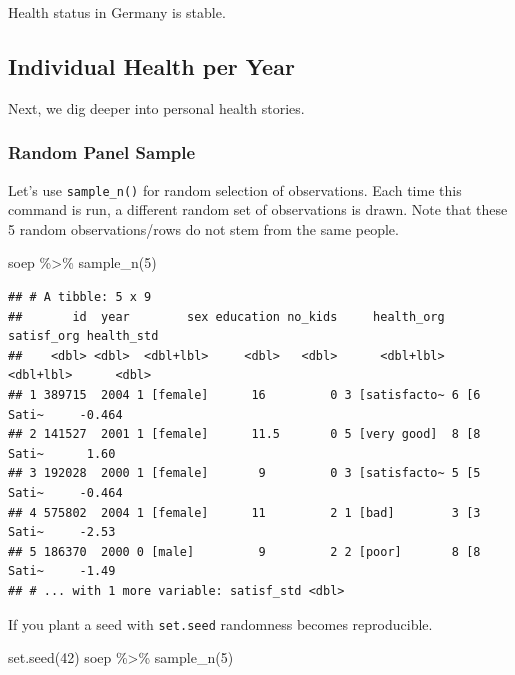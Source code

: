 \documentclass[
]{book}
\newenvironment{Shaded}{\begin{snugshade}}{\end{snugshade}}
\newcommand{\DecValTok}[1]{\textcolor[rgb]{0.00,0.00,0.81}{#1}}
\newcommand{\FunctionTok}[1]{\textcolor[rgb]{0.00,0.00,0.00}{#1}}
\newcommand{\NormalTok}[1]{#1}
\newcommand{\SpecialCharTok}[1]{\textcolor[rgb]{0.00,0.00,0.00}{#1}}
\begin{document}
Health status in Germany is stable.

\hypertarget{individual-health-per-year}{%
\subsection{Individual Health per Year}\label{individual-health-per-year}}

Next, we dig deeper into personal health stories.

\hypertarget{random-panel-sample}{%
\subsubsection{Random Panel Sample}\label{random-panel-sample}}

Let's use \texttt{sample\_n()} for random selection of observations. Each time this command is run, a different random set of observations is drawn. Note that these 5 random observations/rows do not stem from the same people.

\begin{Shaded}
\begin{Highlighting}[]
\NormalTok{soep }\SpecialCharTok{\%\textgreater{}\%} \FunctionTok{sample\_n}\NormalTok{(}\DecValTok{5}\NormalTok{) }
\end{Highlighting}
\end{Shaded}

\begin{verbatim}
## # A tibble: 5 x 9
##       id  year        sex education no_kids     health_org satisf_org health_std
##    <dbl> <dbl>  <dbl+lbl>     <dbl>   <dbl>      <dbl+lbl>  <dbl+lbl>      <dbl>
## 1 389715  2004 1 [female]      16         0 3 [satisfacto~ 6 [6 Sati~     -0.464
## 2 141527  2001 1 [female]      11.5       0 5 [very good]  8 [8 Sati~      1.60 
## 3 192028  2000 1 [female]       9         0 3 [satisfacto~ 5 [5 Sati~     -0.464
## 4 575802  2004 1 [female]      11         2 1 [bad]        3 [3 Sati~     -2.53 
## 5 186370  2000 0 [male]         9         2 2 [poor]       8 [8 Sati~     -1.49 
## # ... with 1 more variable: satisf_std <dbl>
\end{verbatim}

If you plant a seed with \texttt{set.seed} randomness becomes reproducible.

\begin{Shaded}
\begin{Highlighting}[]
\FunctionTok{set.seed}\NormalTok{(}\DecValTok{42}\NormalTok{)}
\NormalTok{soep }\SpecialCharTok{\%\textgreater{}\%} \FunctionTok{sample\_n}\NormalTok{(}\DecValTok{5}\NormalTok{) }
\end{Highlighting}
\end{Shaded}
\end{document}
